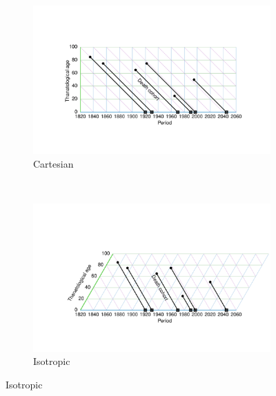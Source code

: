\documentclass[12pt,oneside,a4paper]{article} %
\begin{document}
\begin{figure} 
\caption{A TPD diagram in two projections.}
\label{fig:TPD}
\centering
\begin{subfigure}{1.1\textwidth}
\caption{Cartesian}
\vspace{-5em}
\label{fig:TPDrt}
\includegraphics[scale=0.8]{Figures/TPDrt.pdf}
\end{subfigure}
\\\vspace{-2em}
\begin{subfigure}{1.1\textwidth}
\caption{Isotropic}
\vspace{-6em}
\label{fig:TPDeq}
\includegraphics[scale=0.8]{Figures/TPDeq.pdf}
\end{subfigure}
\end{figure} 

\FloatBarrier
\end{document}

